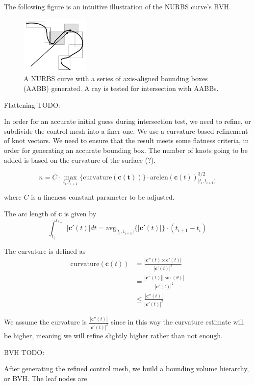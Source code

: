 \documentclass[acmtog]{acmart}
\begin{document}
The following figure is an intuitive illustration of the NURBS curve's BVH. 

\begin{figure}[H]
	\centering
	\includegraphics[width=0.3\textwidth]{pictures/bvh.jpg}
	\caption{A NURBS curve with a series of axis-aligned bounding boxes (AABB) generated. A ray is tested for intersection with AABBs.}
\end{figure}

Flattening TODO:

In order for an accurate initial guess during intersection test, we need to refine, or subdivide the control mesh into a finer one. We use a curvature-based refinement of knot vectors. We need to ensure that the result meets some flatness criteria, in order for generating an accurate bounding box. The number of knots going to be added is based on the curvature of the surface (?). 

\[
	n = C \cdot \max_{t_i, t_{i+1}} \{ \mathrm{curvature}(\mathbf{c(t)}) \} \cdot \mathrm{arclen}(\mathbf{c}(t))_{[t_i, t_{i+1})}^{3/2}	
\]

where $C$ is a fineness constant parameter to be adjusted. 

The arc length of $\mathbf{c}$ is given by \[
	\int_{t_i}^{t_{i+1}} |\mathbf{c}'(t) | dt 
	= \mathrm{avg}_{[t_i, t_{i+1})} \{ |\mathbf{c}'(t)| \} \cdot (t_{i+1} - t_i)	
\]

The curvature is defined as \[\begin{aligned}
	\mathrm{curvature}(\mathbf{c}(t)) &= 
	\frac{|\mathbf{c}''(t) \times \mathbf{c}'(t)|}{|\mathbf{c}'(t)|^3}\\
	&= \frac{|\mathbf{c}''(t)| |\sin(\theta)|}{|\mathbf{c}'(t)|^2}\\
	&\leq \frac{|\mathbf{c}''(t)|}{|\mathbf{c}'(t)|^2}
\end{aligned}\]

We assume the curvature is $\frac{|\mathbf{c}''(t)|}{|\mathbf{c}'(t)|^2}$ since in this way the curvature estimate will be higher, meaning we will refine slightly higher rather than not enough. 

BVH TODO:

After generating the refined control mesh, we build a bounding volume hierarchy, or BVH. The leaf nodes are 
\end{document}
